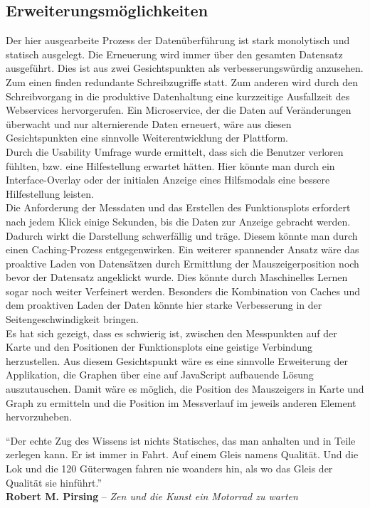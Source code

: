 \subsection{Erweiterungsmöglichkeiten}

Der hier ausgearbeite Prozess der Datenüberführung ist stark monolytisch und statisch ausgelegt. Die Erneuerung wird immer über den gesamten Datensatz ausgeführt.
Dies ist aus zwei Gesichtspunkten als verbesserungswürdig anzusehen. Zum einen finden redundante Schreibzugriffe statt. Zum anderen wird durch den Schreibvorgang in die produktive Datenhaltung eine kurzzeitige Ausfallzeit des Webservices hervorgerufen.
Ein Microservice, der die Daten auf Veränderungen überwacht und nur alternierende Daten erneuert, wäre aus diesen Gesichtspunkten eine sinnvolle Weiterentwicklung der Plattform. 
\\

Durch die Usability Umfrage wurde ermittelt, dass sich die Benutzer verloren fühlten, bzw. eine Hilfestellung erwartet hätten. Hier könnte man durch ein Interface-Overlay oder der initialen Anzeige eines Hilfsmodals eine bessere Hilfestellung leisten.
\\

Die Anforderung der Messdaten und das Erstellen des Funktionsplots erfordert nach jedem Klick einige Sekunden, bis die Daten zur Anzeige gebracht werden. Dadurch wirkt die Darstellung schwerfällig und träge. Diesem könnte man durch einen Caching-Prozess entgegenwirken. Ein weiterer spannender Ansatz wäre das proaktive Laden von Datensätzen durch Ermittlung der Mauszeigerposition noch bevor der Datensatz angeklickt wurde. Dies könnte durch Maschinelles Lernen sogar noch weiter Verfeinert werden. Besonders die Kombination von Caches und dem proaktiven Laden der Daten könnte hier starke Verbesserung in der Seitengeschwindigkeit bringen. 
\\

Es hat sich gezeigt, dass es schwierig ist, zwischen den Messpunkten auf der Karte und den Positionen der Funktionsplots eine geistige Verbindung herzustellen. Aus diesem Gesichtspunkt wäre es eine sinnvolle Erweiterung der Applikation, die Graphen über eine auf JavaScript aufbauende Lösung auszutauschen. Damit wäre es möglich, die Position des Mauszeigers in Karte und Graph zu ermitteln und die Position im Messverlauf im jeweils anderen Element hervorzuheben.  


\newpage


\vspace*{\fill}\thispagestyle{plain}
"`Der echte Zug des Wissens ist nichts Statisches, das man anhalten und in Teile zerlegen kann. Er ist immer in Fahrt. Auf einem Gleis namens Qualität. Und die Lok und die 120 Güterwagen fahren nie woanders hin, als wo das Gleis der Qualität sie hinführt."'
\\
\hrulefill \vspace{0.3cm}
\hfill\textbf{Robert M. Pirsing} -- \textit{Zen und die Kunst ein Motorrad zu warten}
\vspace*{\fill}

